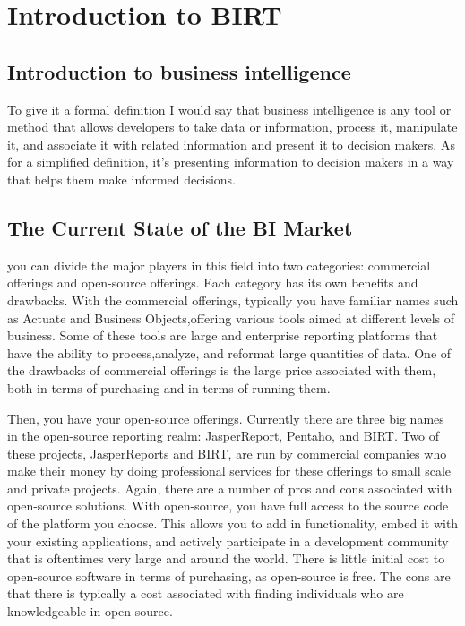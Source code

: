 
\section{Introduction to BIRT}
\subsection{Introduction to business intelligence}

To give it a formal definition I would say that business intelligence is any tool or method that allows developers to take data or information, process it, manipulate it, and associate it with related information and present it to decision makers. As for a simplified definition, it's presenting information to decision makers in a way that helps them make informed decisions.

\subsection{The Current State of the BI Market}
you can divide the major players in this field into two categories: commercial offerings and open-source offerings. Each category has its own benefits and drawbacks. With the commercial offerings, typically you have familiar names such as Actuate and Business Objects,offering various tools aimed at different levels of business. Some of these tools are large and enterprise reporting platforms that have the ability to process,analyze, and reformat large quantities of data. One of the drawbacks of commercial offerings is the large price associated with them, both in terms of purchasing and in terms of running them.

Then, you have your open-source offerings. Currently there are three big names in the open-source reporting realm: JasperReport, Pentaho, and BIRT. Two of these projects, JasperReports and BIRT, are run by commercial companies who make their money by doing professional services for these offerings to small scale and private projects. Again, there are a number of pros and cons associated with open-source solutions. With open-source, you have full access to the source code of the platform you choose. This allows you to add in functionality, embed it with your existing applications, and actively participate in a development community that is oftentimes very large and around the world. There is little initial cost to open-source software in terms of purchasing, as open-source is free. The cons are that there is typically a cost associated with finding individuals who are knowledgeable in open-source.

